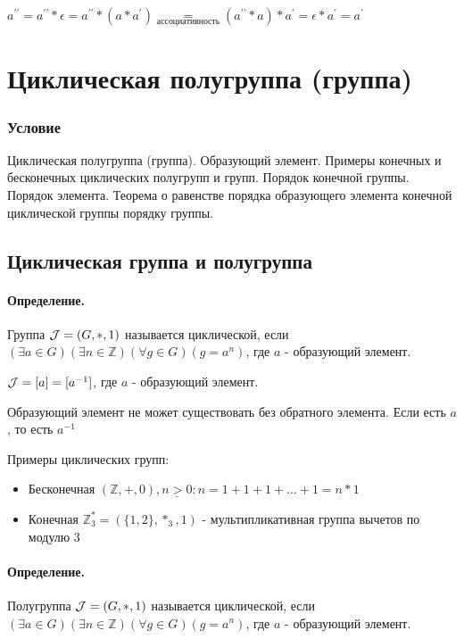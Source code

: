 \documentclass{report}
\begin{document}
$a^{\prime\prime} = a^{\prime\prime} * \epsilon =
    a^{\prime\prime} * (a * a^{\prime}) \underset{ассоциативность}{=}
    (a^{\prime\prime} * a) * a^{\prime} = \epsilon * a^{\prime} = a^{\prime}$

\newpage

\section{Циклическая полугруппа (группа)}
\subsubsection{Условие}
Циклическая полугруппа (группа). Образующий элемент. Примеры конечных и
бесконечных циклических полугрупп и групп. Порядок конечной группы. Порядок
элемента. Теорема о равенстве порядка образующего элемента конечной циклической
группы порядку группы.

\subsection{Циклическая группа и полугруппа}
\paragraph*{Определение.} Группа ${\cal J} = (G, *, 1)$ называется циклической,
если $(\exists a \in G)(\exists n \in \mathbb{Z})(\forall g \in G)(g = a^{n})$, где $a$ - образующий элемент.


${\cal J} = [a] = [a^{-1}]$, где $a$ - образующий элемент.


Образующий элемент не может существовать без обратного элемента. Если есть $a$, то есть $a^{-1}$

\medskip

Примеры циклических групп:
\begin{itemize}
    \item Бесконечная\newline
          $(\mathbb{Z}, +, 0), \underline{n > 0}: n = 1 + 1 + 1 + \ldots + 1 = n * 1$
    \item Конечная\newline
          $\mathbb{Z}^{*}_3 = (\{1,2\}, *_{3}, 1)$ - мультипликативная группа вычетов по модулю 3
\end{itemize}

\paragraph*{Определение.} Полугруппа ${\cal J} = (G, *, 1)$ называется циклической,
если $(\exists a \in G)(\exists n \in \mathbb{Z})(\forall g \in G)(g = a^{n})$, где $a$ - образующий элемент.
\end{document}
